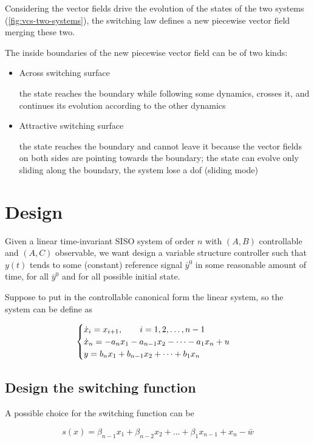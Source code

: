 Considering the vector fields drive the evolution of the states of the two systems (\cref{fig:vcs-two-systems}), the switching law defines a new piecewise vector field merging these two.

The inside boundaries of the new piecewise vector field can be of two kinds:

\begin{itemize}
    \item Across switching surface

    the state reaches the boundary while following some dynamics, crosses it, and continues its evolution according to the other dynamics

    \item Attractive switching surface

    the state reaches the boundary and cannot leave it because the vector fields on both sides are pointing towards the boundary;
    the state can evolve only sliding along the boundary, the system lose a dof (sliding mode)
\end{itemize}

\section{Design}

Given a linear time-invariant SISO system of order $n$ with $(A,B)$ controllable and $(A,C)$ observable, we want design a variable structure controller such that $y(t)$ tends to some (constant) reference signal $\bar y^0$ in some reasonable amount of time, for all $\bar y^0$ and for all possible initial state.

Suppose to put in the controllable canonical form the linear system, so the system can be define as

\[
    \begin{cases}
        \dot{x}_i = x_{i+1}, \qquad i = 1,2,\dots, n-1 \\
        \dot{x}_n = - a_n x_1 - a_{n-1} x_2 - \dots - a_1 x_n + u \\
        y = b_n x_1 + b_{n-1} x_2 + \dots + b_1 x_n
    \end{cases}
\]

\subsection{Design the switching function}

A possible choice for the switching function can be

\[
    s(x) = \beta_{n-1} x_1 + \beta_{n-2} x_2 + \dots + \beta_1 x_{n-1} + x_n - \bar w
\]

